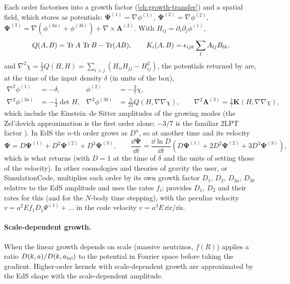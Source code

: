 Each order factorises into a growth factor (\cref{ch:growth-transfer}) and a spatial field, which \fml{} stores as
potentials: $\bm\Psi^{(1)}=\nabla\phi^{(1)}$, $\bm\Psi^{(2)}=\nabla\phi^{(2)}$,
$\bm\Psi^{(3)}=\nabla(\phi^{(3a)}+\phi^{(3b)})+\nabla\times\bm A^{(3)}$. With $H_{ij}=\partial_i\partial_j\phi^{(1)}$,
\begin{equation}
Q(A,B)=\operatorname{Tr} A\,\operatorname{Tr} B-\operatorname{Tr}(AB),\qquad K_i(A,B)=\epsilon_{ijk}\sum_lA_{lj}B_{lk},
\end{equation}
and $\nabla^2\chi=\frac12Q(H,H)=\sum_{i>j}(H_{ii}H_{jj}-H_{ij}^2)$, the potentials returned by
 are, at the time of the input density $\delta$ (in units of the box),
\begin{align}
\nabla^2\phi^{(1)}&=-\delta, & \phi^{(2)}&=-\tfrac37\chi,\label{eq:lpt-potentials}\\
\nabla^2\phi^{(3a)}&=-\tfrac13\det H, & \nabla^2\phi^{(3b)}&=\tfrac{5}{21}Q\!\left(H,\nabla\nabla\chi\right),\qquad
\nabla^2\bm A^{(3)}=\tfrac17\bm K\!\left(H,\nabla\nabla\chi\right),\nonumber
\end{align}
which include the Einstein--de Sitter amplitudes of the growing modes (the Zel'dovich approximation is the first
order alone; $-3/7$ is the familiar 2LPT factor \cite{Scoccimarro1998,Crocce2006}). In EdS the $n$-th order grows as
$D^n$, so at another time and its velocity
\begin{equation}
\bm\Psi=D\bm\Psi^{(1)}+D^2\bm\Psi^{(2)}+D^3\bm\Psi^{(3)},\qquad
\frac{\dd\bm\Psi}{\dd t}=\frac{\dd\ln D}{\dd t}\left(D\bm\Psi^{(1)}+2D^2\bm\Psi^{(2)}+3D^3\bm\Psi^{(3)}\right),
\label{eq:lpt-velocity}
\end{equation}
which is what  returns (with $D=1$ at the time of $\delta$ and the units of
 setting those of the velocity). In other cosmologies and theories of gravity the user, or
SimulationCode, multiplies each order by its own growth factor $D_1$, $D_2$, $D_{3a}$, $D_{3b}$ relative to the EdS
amplitude and uses the rates $f_i$;  provides $D_1$, $D_2$ and their rates for this (and for the
$N$-body time stepping), with the peculiar velocity $v=a^2E f_1D_1\Psi^{(1)}+\ldots$ in the code velocity
$v=a^3E\,\dd x/\dd a$.

\paragraph*{Scale-dependent growth.} When the linear growth depends on scale (massive neutrinos, $f(R)$)
 applies a ratio $D(k,a)/D(k,a_{\rm ini})$ to the
potential in Fourier space before taking the gradient. Higher-order kernels with scale-dependent growth are
approximated by the EdS shape with the scale-dependent amplitude.

